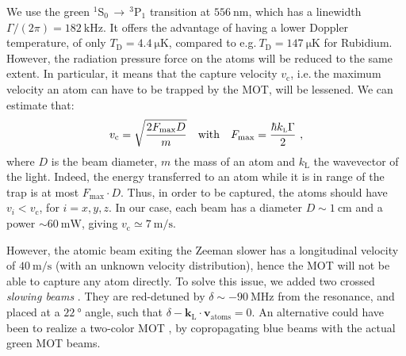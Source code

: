 \documentclass[11pt]{article}
\newcommand{\mathsc}[1]{\mathrm{\scriptscriptstyle {#1}}}
\numberwithin{equation}{section}
\numberwithin{figure}{section}
\begin{document}
We use the green $^1$S$_0 \, \rightarrow \, ^3$P$_1$ transition at $\SI{556}{\nano\metre}$, which has a linewidth $\Gamma / (2 \pi) = \SI{182}{\kilo\hertz}$. It offers the advantage of having a lower Doppler temperature, of only $T_\mathsc{D} = \SI{4.4}{\micro\kelvin}$, compared to e.g.$~T_\mathsc{D} = \SI{147}{\micro\kelvin}$ for Rubidium. However, the radiation pressure force on the atoms will be reduced to the same extent. In particular, it means that the capture velocity $v_\text{c}$, i.e.$~$the maximum velocity an atom can have to be trapped by the MOT, will be lessened. We can estimate that:
%
\begin{equation}
	\label{eq:capture_velocity}
	v_\text{c} = \sqrt{\frac{2 F_\text{max} D}{m}} \qq{with} F_\text{max} = \frac{\hbar k_\mathsc{L} \Gamma}{2}~,
\end{equation}
%
where  $D$ is the beam diameter, $m$ the mass of an atom and $k_\mathsc{L}$ the wavevector of the light. Indeed, the energy transferred to an atom while it is in range of the trap is at most $F_\text{max} \cdot D$.  Thus, in order to be captured, the atoms should have $v_i < v_\text{c}$, for $i = x, y, z$. In our case,  each beam has a diameter $D \sim \SI{1}{\centi\metre}$ and a power $\sim \SI{60}{\milli\watt}$, giving $v_\text{c} \simeq \SI{7}{\metre\per\second}$.

However, the atomic beam exiting the Zeeman slower has a longitudinal velocity of $\SI{40}{\metre\per\second}$ (with an unknown velocity distribution), hence the MOT will not be able to capture any atom directly. To solve this issue, we added two crossed \emph{slowing beams}  \citep[previously used by][for Yb]{2020_Plotkin-Swing}. They are red-detuned by $\delta \sim - \SI{90}{\mega\hertz}$ from the resonance, and placed at a $\SI{22}{\degree}$ angle, such that $\delta - \mathbf{k}_\mathsc{L} \cdot \mathbf{v}_\text{atoms} = 0$. An  alternative could have been to realize a two-color MOT \citep[see][for an example with Yb]{2015_kawasaki}, by copropagating blue beams with the actual green MOT beams. \\
\end{document}

